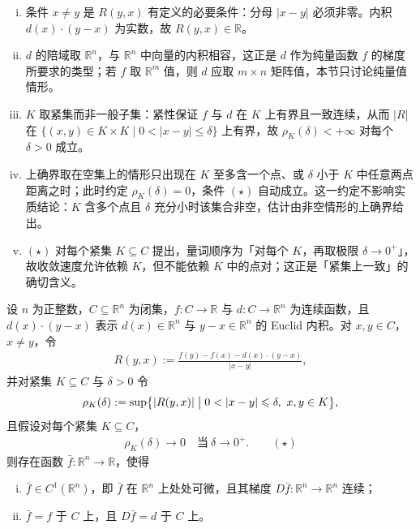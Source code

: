 \documentclass[../../main.tex]{subfiles}%
\begin{document}
\begin{remark}\label{remark:ch06-def-6-10-记号-条件}
\begin{enumerate}[(i)]
\item 条件 $x\neq y$ 是 $R(y,x)$ 有定义的必要条件：分母 $\lvert x-y\rvert$ 必须非零。内积 $d(x)\cdot(y-x)$ 为实数，故 $R(y,x)\in\mathbb{R}$。
\item $d$ 的陪域取 $\mathbb{R}^n$，与 $\mathbb{R}^n$ 中向量的内积相容，这正是 $d$ 作为纯量函数 $f$ 的梯度所要求的类型；若 $f$ 取 $\mathbb{R}^m$ 值，则 $d$ 应取 $m\times n$ 矩阵值，本节只讨论纯量值情形。
\item $K$ 取紧集而非一般子集：紧性保证 $f$ 与 $d$ 在 $K$ 上有界且一致连续，从而 $\lvert R\rvert$ 在 $\{(x,y)\in K\times K\mid 0<\lvert x-y\rvert\leqslant\delta\}$ 上有界，故 $\rho_K(\delta)<+\infty$ 对每个 $\delta>0$ 成立。
\item 上确界取在空集上的情形只出现在 $K$ 至多含一个点、或 $\delta$ 小于 $K$ 中任意两点距离之时；此时约定 $\rho_K(\delta)=0$，条件 $(\star)$ 自动成立。这一约定不影响实质结论：$K$ 含多个点且 $\delta$ 充分小时该集合非空，估计由非空情形的上确界给出。
\item $(\star)$ 对每个紧集 $K\subseteq C$ 提出，量词顺序为「对每个 $K$，再取极限 $\delta\to0^{+}$」，故收敛速度允许依赖 $K$，但不能依赖 $K$ 中的点对；这正是「紧集上一致」的确切含义。
\end{enumerate}
\end{remark}

\begin{theorem}\label{theorem:ch06-6-10}
设 $n$ 为正整数，$C\subseteq\mathbb{R}^n$ 为闭集，$f:C\to\mathbb{R}$ 与 $d:C\to\mathbb{R}^n$ 为连续函数，且 $d(x)\cdot(y-x)$ 表示 $d(x)\in\mathbb{R}^n$ 与 $y-x\in\mathbb{R}^n$ 的 Euclid 内积。对 $x,y\in C$，$x\neq y$，令
\begin{align*}
R(y,x):=\frac{f(y)-f(x)-d(x)\cdot(y-x)}{\lvert x-y\rvert},
\end{align*}
并对紧集 $K\subseteq C$ 与 $\delta>0$ 令
\begin{align*}
\rho_K(\delta):=\sup\bigl\{\lvert R(y,x)\rvert\bigm|0<\lvert x-y\rvert\leqslant\delta,\ x,y\in K\bigr\},
\end{align*}
且假设对每个紧集 $K\subseteq C$，
\begin{align*}
\rho_K(\delta)\to0\quad\text{当}\ \delta\to0^{+}. \qquad(\star)
\end{align*}
则存在函数 $\bar f:\mathbb{R}^n\to\mathbb{R}$，使得
\begin{enumerate}[(i)]
\item $\bar f\in C^1(\mathbb{R}^n)$，即 $\bar f$ 在 $\mathbb{R}^n$ 上处处可微，且其梯度 $D\bar f:\mathbb{R}^n\to\mathbb{R}^n$ 连续；
\item $\bar f=f$ 于 $C$ 上，且 $D\bar f=d$ 于 $C$ 上。
\end{enumerate}
\end{theorem}
\end{document}

